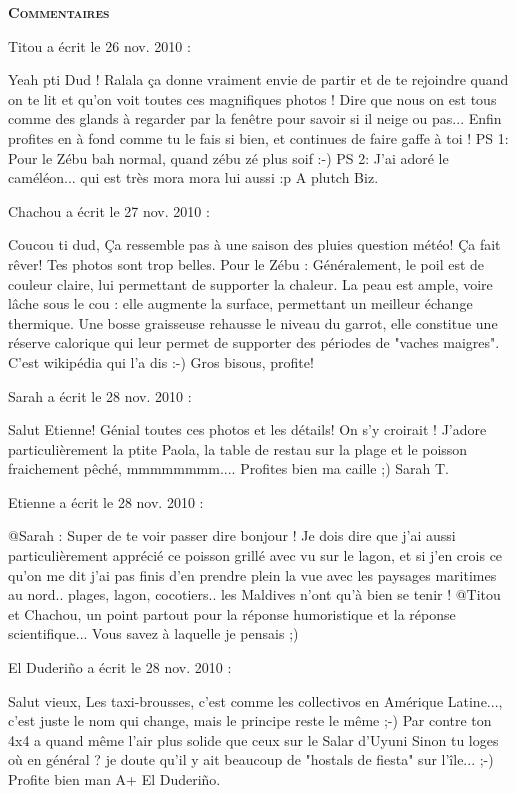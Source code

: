 \bigskip
\textbf{\textsc{Commentaires}}

\medskip
Titou a écrit le 26 nov. 2010 :
\begin{displayquote}
Yeah pti Dud !
Ralala ça donne vraiment envie de partir et de te rejoindre quand on te lit et qu'on voit toutes ces magnifiques photos !
Dire que nous on est tous comme des glands à regarder par la fenêtre pour savoir si il neige ou pas... Enfin profites en à fond comme tu le fais si bien, et continues de faire gaffe à toi !
PS 1: Pour le Zébu bah normal, quand zébu zé plus soif :-)
PS 2: J'ai adoré le caméléon... qui est très mora mora lui aussi :p
A plutch
Biz.
\end{displayquote}

\medskip
Chachou a écrit le 27 nov. 2010 :
\begin{displayquote}
Coucou ti dud,
Ça ressemble pas à une saison des pluies question météo! Ça fait rêver! Tes photos sont trop belles.
Pour le Zébu : Généralement, le poil est de couleur claire, lui permettant de supporter la chaleur. La peau est ample, voire lâche sous le cou : elle augmente la surface, permettant un meilleur échange thermique.
Une bosse graisseuse rehausse le niveau du garrot, elle constitue une réserve calorique qui leur permet de supporter des périodes de "vaches maigres". C'est wikipédia qui l'a dis :-)
Gros bisous, profite!
\end{displayquote}

\medskip
Sarah a écrit le 28 nov. 2010 :
\begin{displayquote}
Salut Etienne!
Génial toutes ces photos et les détails!
On s'y croirait !
J'adore particulièrement la ptite Paola, la table de restau sur la plage et le poisson fraichement pêché, mmmmmmmm....
Profites bien ma caille ;)
Sarah T.
\end{displayquote}

\medskip
Etienne a écrit le 28 nov. 2010 :
\begin{displayquote}
@Sarah : Super de te voir passer dire bonjour ! Je dois dire que j'ai aussi particulièrement apprécié ce poisson grillé avec vu sur le lagon, et si j'en crois ce qu'on me dit j'ai pas finis d'en prendre plein la vue avec les paysages maritimes au nord.. plages, lagon, cocotiers.. les Maldives n'ont qu'à bien se tenir !
@Titou et Chachou, un point partout pour la réponse humoristique et la réponse scientifique... Vous savez à laquelle je pensais ;)
\end{displayquote}

\medskip
El Duderiño a écrit le 28 nov. 2010 :
\begin{displayquote}
Salut vieux,
Les taxi-brousses, c'est comme les collectivos en Amérique Latine..., c'est juste le nom qui change, mais le principe reste le même ;-)
Par contre ton 4x4 a quand même l'air plus solide que ceux sur le Salar d'Uyuni
Sinon tu loges où en général ? je doute qu'il y ait beaucoup de "hostals de fiesta" sur l'île... ;-)
Profite bien man
A+
El Duderiño.
\end{displayquote}

